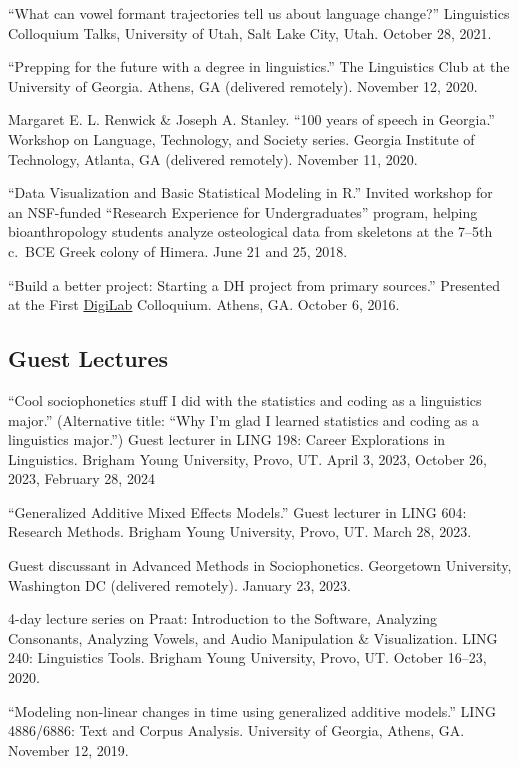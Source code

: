 \documentclass[
]{article}
\begin{document}
``What can vowel formant trajectories tell us about language change?''
Linguistics Colloquium Talks, University of Utah, Salt Lake City, Utah.
October 28, 2021.

``Prepping for the future with a degree in linguistics.'' The
Linguistics Club at the University of Georgia. Athens, GA (delivered
remotely). November 12, 2020.

Margaret E. L. Renwick \& {Joseph A. Stanley}. ``100 years of speech in
Georgia.'' Workshop on Language, Technology, and Society series. Georgia
Institute of Technology, Atlanta, GA (delivered remotely). November 11,
2020.

``Data Visualization and Basic Statistical Modeling in R.'' Invited
workshop for an NSF-funded ``Research Experience for Undergraduates''
program, helping bioanthropology students analyze osteological data from
skeletons at the 7--5th c.~BCE Greek colony of Himera. June 21 and 25,
2018.

``Build a better project: Starting a DH project from primary sources.''
Presented at the First \href{http://digi.uga.edu/digilab/}{DigiLab}
Colloquium. Athens, GA. October 6, 2016.

\hypertarget{guest-lectures}{%
\subsection{Guest Lectures}\label{guest-lectures}}

``Cool sociophonetics stuff I did with the statistics and coding as a
linguistics major.'' (Alternative title: ``Why I'm glad I learned
statistics and coding as a linguistics major.'') Guest lecturer in LING
198: Career Explorations in Linguistics. Brigham Young University,
Provo, UT. April 3, 2023, October 26, 2023, February 28, 2024

``Generalized Additive Mixed Effects Models.'' Guest lecturer in LING
604: Research Methods. Brigham Young University, Provo, UT. March 28,
2023.

Guest discussant in Advanced Methods in Sociophonetics. Georgetown
University, Washington DC (delivered remotely). January 23, 2023.

4-day lecture series on Praat: Introduction to the Software, Analyzing
Consonants, Analyzing Vowels, and Audio Manipulation \& Visualization.
LING 240: Linguistics Tools. Brigham Young University, Provo, UT.
October 16--23, 2020.

``Modeling non-linear changes in time using generalized additive
models.'' LING 4886/6886: Text and Corpus Analysis. University of
Georgia, Athens, GA. November 12, 2019.
\end{document}
